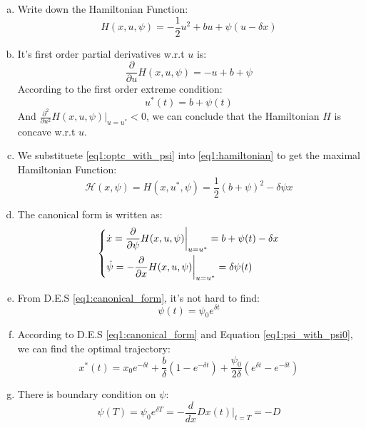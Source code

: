 \documentclass{article}
\begin{document}
\begin{enumerate}[a)]
    \item Write down the Hamiltonian Function:
            \begin{equation}\label{eq1:hamiltonian}
                H(x,u,\psi)=-\frac{1}{2}u^2+bu+\psi (u-\delta x)
            \end{equation}
    \item It's first order partial derivatives w.r.t $u$ is:
            \begin{equation}
                \frac{\partial }{\partial u}H(x,u,\psi)=-u+b+\psi
            \end{equation}
             According to the first order extreme condition:
             \begin{equation}\label{eq1:optc_with_psi}
                u^*(t)=b+\psi(t)
             \end{equation}
             And $\frac{\partial^2 }{\partial u^2}H(x,u,\psi)\big|_{u=u^*}<0$, we can conclude that the Hamiltonian $H$ is concave w.r.t $u$.
    \item We substituete \eqref{eq1:optc_with_psi} into \eqref{eq1:hamiltonian} to get the maximal Hamiltonian Function:
             \begin{equation}
                \mathcal{H}(x, \psi)=H(x,u^*,\psi)=\frac{1}{2}(b+\psi)^2-\delta\psi x
             \end{equation}
    \item The canonical form is written as:
             \begin{equation}\label{eq1:canonical_form}
                 \begin{dcases}
                    \dot{x}= \frac{\partial }{\partial \psi}H(x,u,\psi)\bigg|_{u=u^*}=b+\psi(t)-\delta x\\
                    \dot{\psi}=-\frac{\partial }{\partial x}H(x,u,\psi)\bigg|_{u=u^*}=\delta\psi(t)
                \end{dcases}
             \end{equation}
    \item From D.E.S \eqref{eq1:canonical_form}, it's not hard to find:
             \begin{equation}\label{eq1:psi_with_psi0}
                 \psi(t)=\psi_0 e^{\delta t}
             \end{equation}
    \item According to D.E.S \eqref{eq1:canonical_form} and Equation \eqref{eq1:psi_with_psi0}, we can find the optimal trajectory:
             \begin{equation}\label{eq1:optx_with_psi0}
                 x^*(t)=x_0e^{-\delta t}+\frac{b}{\delta}(1-e^{-\delta t})+\frac{\psi_0}{2\delta}(e^{\delta t}-e^{-\delta t})
             \end{equation}
    \item There is boundary condition on $\psi$:
    \begin{equation}
        \psi(T)=\psi_0 e^{\delta T}=-\frac{d}{dx}Dx(t)\bigg|_{t=T}=-D
    \end{equation}


\end{enumerate}
\end{document}
